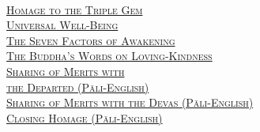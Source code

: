 {  \ifafive\vspace{1.0cm}\fi
  \ifninebythirteen\vspace{0.8cm}\fi
  \ifbfive\vspace{1.0cm}\fi

  {\libertinusFont\selectfont\textbf{\textsc{\ifafive\fontsize{18}{12}\fi\ifninebythirteen\fontsize{13}{8.5}\fi\ifbfive\fontsize{22}{18}\fi\selectfont{}}}}\\

\textsc{\ifafive\fontsize{14.4}{28}\fi\ifninebythirteen\fontsize{8.7}{17}\fi\ifbfive\fontsize{16}{33.5}\fi\selectfont
    \hyperref[dedication-of-offerings]{Homage to the Triple Gem} \ifdigital\else\pageref{dedication-of-offerings}\fi\\
    \hyperref[universal-well-being]{Universal Well-Being} \ifdigital\else\pageref{universal-well-being}\fi\\
    \hyperref[seven-factors-of-awakening]{The Seven Factors of Awakening} \ifdigital\else\pageref{seven-factors-of-awakening}\fi\\
    \hyperref[words-on-loving-kindness]{The Buddha's Words on Loving-Kindness} \ifdigital\else\pageref{words-on-loving-kindness}\fi\\
    \hyperref[sharing-merits-departed]{Sharing of Merits with \ifninebythirteen\\[-0.6em]\fi the Departed (Pāli-English)} \ifdigital\else\pageref{sharing-merits-departed}\fi\\
    \hyperref[sharing-merits-devas]{Sharing of Merits with the Devas (Pāli-English)} \ifdigital\else\pageref{sharing-merits-devas}\fi\\
    \hyperref[closing-homage]{Closing Homage (Pāli-English)} \ifdigital\else\pageref{closing-homage}\fi\\
  }

  \clearpage

}
